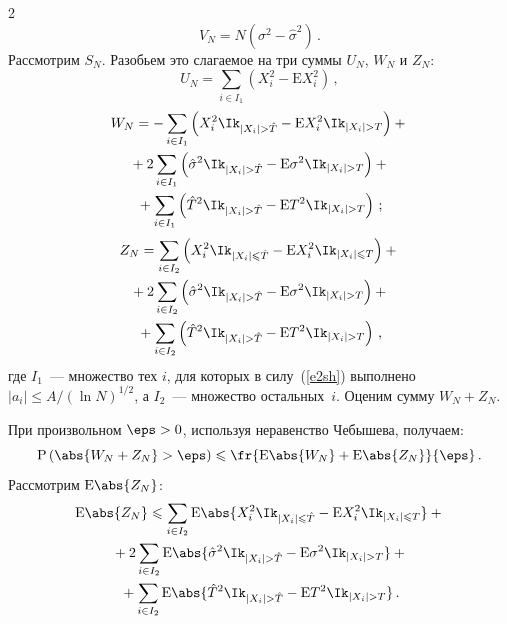 \begin{multicols}{2}
\noindent
$$
V_N=N\left(\sigma^2-\hat{\sigma}^2\right)\,.
$$
Рассмотрим $S_N$. Разобьем это слагаемое на три суммы $U_N$, $W_N$ и $Z_N$:
$$
U_N=\sum\limits_{i\in I_1}\left(X_i^2-\mbox{E}X_i^2\right)\,,
$$
\begin{multline*}
W_N=-\sum\limits_{i\in I_1}\left(X_i^2\Ik_{|X_i|> \hat{T}}-\mbox{E}X_i^2\Ik_{|X_i|>T}\right)+{}\\
{}+2\sum\limits_{i\in I_1}\left(\hat{\sigma}^2\Ik_{|X_i|> \hat{T}}-\mbox{E}\sigma^2\Ik_{|X_i|> T}\right)+{}\\
{}+ \sum\limits_{i\in I_1}\left(\hat{T}^2\Ik_{|X_i|> 
\hat{T}}-\mbox{E}T^2\Ik_{|X_i|> T}\right)\,;
\end{multline*}
\begin{multline*}
Z_N=\sum\limits_{i\in I_2}\left(X_i^2\Ik_{|X_i|\leqslant 
\hat{T}}-\mbox{E}X_i^2\Ik_{|X_i|\leqslant T}\right)+{}\\
{}+
2\sum\limits_{i\in I_2}\left(\hat{\sigma}^2\Ik_{|X_i|> \hat{T}}-\mbox{E}\sigma^2\Ik_{|X_i|> T}\right)+{}\\
{}+\sum\limits_{i\in I_2}\left(\hat{T}^2\Ik_{|X_i|> \hat{T}}-\mbox{E}T^2\Ik_{|X_i|> T}\right)\,,
\end{multline*}
где $I_1$~--- множество тех $i$, для которых в силу~(\ref{e2sh}) выполнено 
$|a_i|\leqslant{A}/{(\ln N)^{1/2}}$, а $I_2$~--- множество остальных~$i$. 
Оценим сумму $W_N+Z_N$.

При произвольном $\eps>0$, используя неравенство Чебышева, получаем:
$$
\mbox{P}\left(\abs{W_N+Z_N}>\eps\right)\leqslant
\fr{\mbox{E}\abs{W_N}+\mbox{E}\abs{Z_N}}{\eps}\,.
$$
Рассмотрим $\mbox{E}\abs{Z_N}$:
\begin{multline*}
\mbox{E}\abs{Z_N}\leqslant\sum\limits_{i\in I_2}\mbox{E}\abs{X_i^2\Ik_{|X_i|\leqslant 
\hat{T}}-\mbox{E}X_i^2\Ik_{|X_i|\leqslant T}}+{}\\
{}+2\sum\limits_{i\in I_2}\mbox{E}\abs{\hat{\sigma}^2\Ik_{|X_i|>\hat{T}}-
\mbox{E}\sigma^2\Ik_{|X_i|>T}}+{}\\
{}+
\sum\limits_{i\in I_2}\mbox{E}\abs{\hat{T}^2\Ik_{|X_i|>\hat{T}}-
\mbox{E}T^2\Ik_{|X_i|> T}}\,.
\end{multline*}


\end{multicols}
